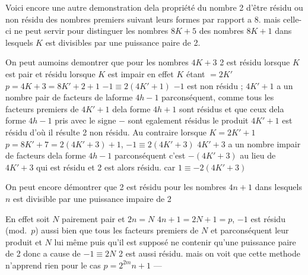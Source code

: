 \documentclass[11pt,a4paper]{article}
\begin{document}


Voici encore une autre demonstration dela propriété du nombre 2 d'être résidu
ou non résidu des nombres premiers suivant leurs formes par rapport a 8. mais
celle-ci ne peut servir pour distinguer les nombres $8K+5$ des nombres  $8K+1$ dans lesquels $K$ est divisibles par une puissance paire
de 2.

On peut aumoins demontrer que pour les nombres $4K+3$ 2 est  résidu lorsque
$K$ est pair et  résidu lorsque $K$ est impair en effet $K$ étant $=2K'$
$p=4K+3=8K'+2+1$ \quad $-1\equiv 2(4K'+1)$
$-1$ est non résidu ; $4K'+1$ a un nombre pair de facteurs de laforme
$4h-1$ parconséquent, comme tous les facteurs premiers de $4K'+1$  dela forme
$4h+1$ sont résidus et que ceux dela forme $4h-1$ pris avec le signe $-$ sont
egalement résidus le produit $4K'+1$ est résidu  d'où il résulte 2 non
résidu. Au contraire lorsque $K=2K'+1$ $p=8K'+7=2(4K'+3)+1$, $-1\equiv 2(4K'+3)$
$4K'+3$ a un nombre impair de facteurs dela forme $4h-1$ parconséquent c'est $-(4K'+3)$
au lieu de $4K'+3$ qui est résidu et 2 est alors résidu. car $1\equiv -2(4K'+3)$

On peut encore démontrer que 2 est résidu pour les nombres $4n+1$ dans lesquels
$n$ est divisible par une puissance impaire de 2

En effet soit $N$ pairement pair et $2n=N$ \quad $4n+1=2N+1=p$, $-1$ est résidu
(mod.~$p$) aussi bien que tous les facteurs premiers de $N$ et parconséquent leur produit
et $N$ lui même puis qu'il est supposé ne contenir qu'une puissance paire de 2
donc a cause de $-1\equiv 2N$ 2 est aussi résidu. mais on voit que cette methode
n'apprend rien pour le cas $p=2^{2m}n+1$ ---
\end{document}
